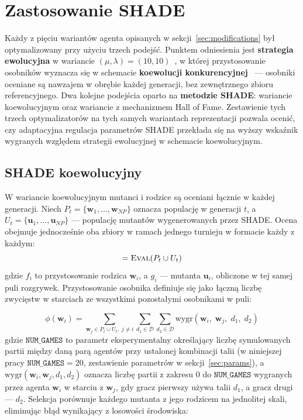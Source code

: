 \section{Zastosowanie SHADE} \label{sec:shade_application}

Każdy z pięciu wariantów agenta opisanych w sekcji~\ref{sec:modifications} był optymalizowany przy użyciu trzech podejść. Punktem odniesienia jest \textbf{strategia ewolucyjna} w wariancie $(\mu,\lambda) = (10,10)$~\cite{sanchez2020}, w której przystosowanie osobników wyznacza się w schemacie \textbf{koewolucji konkurencyjnej}~\cite{stanley2004} --- osobniki oceniane są nawzajem w obrębie każdej generacji, bez zewnętrznego zbioru referencyjnego. Dwa kolejne podejścia oparto na \textbf{metodzie SHADE}: wariancie koewolucyjnym oraz wariancie z mechanizmem Hall of Fame. Zestawienie tych trzech optymalizatorów na tych samych wariantach reprezentacji pozwala ocenić, czy adaptacyjna regulacja parametrów SHADE przekłada się na wyższy wskaźnik wygranych względem strategii ewolucyjnej w schemacie koewolucyjnym.

\subsection{SHADE koewolucyjny} \label{sec:shade_coev}

W wariancie koewolucyjnym mutanci i rodzice są oceniani łącznie w każdej generacji. Niech $P_t = \{\mathbf{w}_1, \ldots, \mathbf{w}_{NP}\}$ oznacza populację w generacji $t$, a $U_t = \{\mathbf{u}_1, \ldots, \mathbf{u}_{NP}\}$ --- populację mutantów wygenerowanych przez SHADE. Ocena obejmuje jednocześnie oba zbiory w ramach jednego turnieju w formacie każdy z każdym:
\begin{equation}
    [f_1, \ldots, f_{NP},\; g_1, \ldots, g_{NP}]
    = \textsc{Eval}(P_t \cup U_t)
\end{equation}
gdzie $f_i$ to przystosowanie rodzica $\mathbf{w}_i$, a $g_i$ --- mutanta $\mathbf{u}_i$, obliczone w tej samej puli rozgrywek. Przystosowanie osobnika definiuje się jako łączną liczbę zwycięstw w starciach ze wszystkimi pozostałymi osobnikami w puli:

\begin{equation}
    \phi(\mathbf{w}_i) = \sum_{\mathbf{w}_j \in P_t \cup U_t,\; j \neq i}
        \sum_{d_1 \in \mathcal{D}} \sum_{d_2 \in \mathcal{D}}
        \text{wygr}(\mathbf{w}_i,\; \mathbf{w}_j,\; d_1,\; d_2)
    \label{eq:fitness_coev}
\end{equation}
gdzie $\texttt{NUM\_GAMES}$ to parametr eksperymentalny określający liczbę symulowanych partii między daną parą agentów przy ustalonej kombinacji talii (w niniejszej pracy $\texttt{NUM\_GAMES} = 20$, zestawienie parametrów w sekcji~\ref{sec:params}), a $\text{wygr}(\mathbf{w}_i, \mathbf{w}_j, d_1, d_2)$ oznacza liczbę partii z zakresu $0$ do $\texttt{NUM\_GAMES}$ wygranych przez agenta $\mathbf{w}_i$ w starciu z $\mathbf{w}_j$, gdy gracz pierwszy używa talii $d_1$, a gracz drugi --- $d_2$. Selekcja porównuje każdego mutanta z jego rodzicem na jednolitej skali, eliminując błąd wynikający z losowości środowiska:


